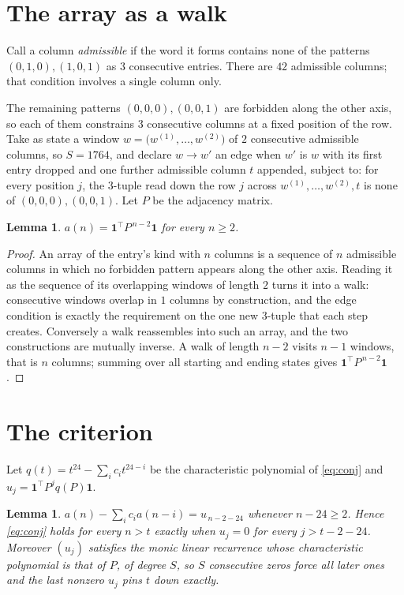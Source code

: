 \documentclass[11pt,a4paper]{article}
\theoremstyle{plain}
\newtheorem{lemma}[theorem]{Lemma}
\theoremstyle{definition}
\begin{document}
\section{The array as a walk}

Call a column \emph{admissible} if the word it forms contains none of the patterns
$(0,1,0), (1,0,1)$ as $3$ consecutive entries. There are $42$ admissible columns; that condition
involves a single column only.

The remaining patterns $(0,0,0), (0,0,1)$ are forbidden along the other axis, so each of them
constrains $3$ consecutive columns at a fixed position of the row. Take as state a
window $w=\bigl(w^{(1)},\dots,w^{(2)}\bigr)$ of $2$ consecutive admissible
columns, so $S=1764$, and declare $w\to w'$ an edge when $w'$ is $w$ with its first entry
dropped and one further admissible column $t$ appended, subject to: for every position
$j$, the $3$-tuple read down the row $j$ across $w^{(1)},\dots,w^{(2)},t$
is none of $(0,0,0), (0,0,1)$. Let $P$ be the adjacency matrix.

\begin{lemma}\label{lem:walk}
$a(n)=\mathbf{1}^{\!\top}P^{\,n-2}\mathbf{1}$ for every $n\ge2$.
\end{lemma}

\begin{proof}
An array of the entry's kind with $n$ columns is a sequence of $n$ admissible columns in
which no forbidden pattern appears along the other axis. Reading it as the sequence of its
overlapping windows of length $2$ turns it into a walk: consecutive windows overlap in
$1$ columns by construction, and the edge condition is exactly the requirement on the one
new $3$-tuple that each step creates. Conversely a walk reassembles into such an array,
and the two constructions are mutually inverse. A walk of length $n-2$ visits $n-1$
windows, that is $n$ columns; summing over all starting and ending states gives
$\mathbf{1}^{\!\top}P^{\,n-2}\mathbf{1}$.
\end{proof}

\section{The criterion}

Let $q(t)=t^{24}-\sum_i c_i t^{24-i}$ be the characteristic polynomial of
\eqref{eq:conj} and $u_j=\mathbf{1}^{\!\top}P^{j}q(P)\mathbf{1}$.

\begin{lemma}\label{lem:crit}
$a(n)-\sum_i c_i a(n-i)=u_{\,n-2-24}$ whenever $n-24\ge2$. Hence
\eqref{eq:conj} holds for every $n>t$ exactly when $u_j=0$ for every
$j>t-2-24$. Moreover $(u_j)$ satisfies the monic linear recurrence whose
characteristic polynomial is that of $P$, of degree $S$, so $S$ consecutive zeros force all
later ones and the last nonzero $u_j$ pins $t$ down exactly.
\end{lemma}
\end{document}
